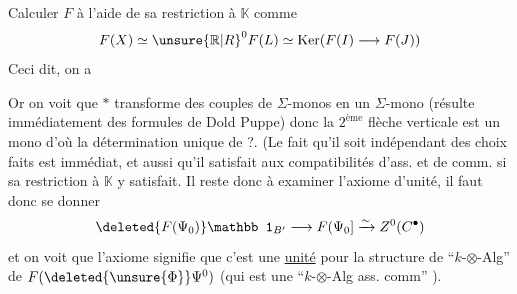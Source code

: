 Calculer $F$ à l'aide de sa restriction à $\mathbb{K}$ comme
\[
F(X)\simeq\unsure{\mathbb R|R}^0F(L)\simeq\operatorname{Ker}(F(I)\longrightarrow F(J))
\]
Ceci dit,  on a

Or on voit que  $*$ transforme des couples de $\Sigma$-monos en un $\Sigma$-mono (résulte immédiatement des formules de Dold Puppe) donc la $2^{\text{ème}}$ flèche verticale est un mono d'où la détermination unique de ?. (Le fait qu'il soit indépendant des choix faits est immédiat, et aussi qu'il satisfait aux compatibilités d'ass. et de comm. si sa restriction à $\mathbb{K}$ y satisfait. Il reste donc à examiner l'axiome d'unité,  il faut donc se donner
\[
\deleted{F(\Psi_0)}\mathbb 1_{B'}\longrightarrow F(\Psi_0]\xrightarrow{\sim}Z^0(C^{\bullet})
\]
et on voit que l'axiome signifie que c'est une \uline{unité} pour la structure de ``$k$-$\otimes$-Alg'' de $F(\deleted{\unsure{\Phi}}\Psi^0)$ (qui est une ``$k$-$\otimes$-Alg ass. comm'' ).
